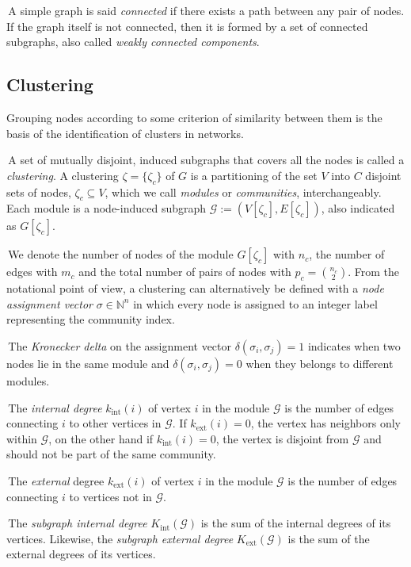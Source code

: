 \noindent\textbullet \,A simple graph is said \emph{connected} if there exists a path between any pair of nodes.
If the graph itself is not connected, then it is formed by a set of connected subgraphs, also called \emph{weakly connected components}.


\subsection{Clustering}\label{sec:clustering}
Grouping nodes according to some criterion of similarity between them is the basis of the identification of clusters in networks.

\noindent\textbullet \,A set of mutually disjoint, induced subgraphs that covers all the nodes is called a \emph{clustering}.
A clustering $\zeta = \{\zeta_c\}$ of $G$ is a partitioning of the set $V$ into $C$ disjoint sets of nodes, $\zeta_c \subseteq V$, which we call \emph{modules} or \emph{communities}, interchangeably.
Each module is a node-induced subgraph $\mathcal{G}:=(V[\zeta_c],E[\zeta_c])$, also indicated as $G[\zeta_c]$.

\noindent\textbullet \,We denote the number of nodes of the module $G[\zeta_c]$ with $n_c$, the number of edges with $m_c$ and the total number of pairs of nodes with $p_c=\binom{n_c}{2}$.
From the notational point of view, a clustering can alternatively be defined with a \emph{node assignment vector} $\sigma \in \mathbb{N}^n$ in which every node is assigned to an integer label representing the community index.


\noindent\textbullet \,The \emph{Kronecker delta} on the assignment vector $\delta(\sigma_i,\sigma_j)=1$ indicates when two nodes lie in the same module and $\delta(\sigma_i,\sigma_j)=0$ when they belongs to different modules.

\noindent\textbullet \,The \emph{internal degree} $k_{\textrm{int}}(i)$ of vertex $i$ in the module $\mathcal{G}$ is the number of edges connecting $i$ to other vertices in $\mathcal{G}$.
If $k_{\textrm{ext}}(i)=0$, the vertex has neighbors only within $\mathcal{G}$, on the other hand if $k_{\textrm{int}}(i)=0$, the vertex is disjoint from $\mathcal{G}$ and should not be part of the same community.

\noindent\textbullet \,The \emph{external} degree $k_{\textrm{ext}}(i)$ of vertex $i$ in the module $\mathcal{G}$ is the number of edges connecting $i$ to vertices not in $\mathcal{G}$.

\noindent\textbullet \,The \emph{subgraph internal degree} $K_{\textrm{int}}(\mathcal{G})$ is the sum of the internal degrees of its vertices.
Likewise, the \emph{subgraph external degree} $K_{\textrm{ext}}(\mathcal{G})$ is the sum of the external degrees of its vertices.

